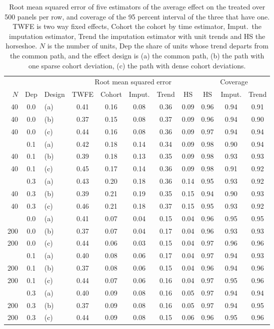 \begin{table}[ht]
\centering
\caption{Root mean squared error of five estimators of the average effect on the treated over 500 panels per row, and coverage of the 95 percent interval of the three that have one. TWFE is two way fixed effects, Cohort the cohort by time estimator, Imput.\ the imputation estimator, Trend the imputation estimator with unit trends and HS the horseshoe. $N$ is the number of units, Dep the share of units whose trend departs from the common path, and the effect design is (a) the common path, (b) the path with one sparse cohort deviation, (c) the path with dense cohort deviations.}
\label{tab:didsimgrid}
\footnotesize
\setlength{\tabcolsep}{4pt}
\begin{tabular}{@{}rclcccccccc@{}}
\toprule
& & & \multicolumn{5}{c}{Root mean squared error} & \multicolumn{3}{c}{Coverage} \\
\cmidrule(lr){4-8}\cmidrule(lr){9-11}
$N$ & Dep & Design & TWFE & Cohort & Imput. & Trend & HS & HS & Imput. & Trend \\
\midrule
40 & 0.0 & (a) & 0.41 & 0.16 & 0.08 & 0.36 & 0.09 & 0.96 & 0.94 & 0.91 \\
40 & 0.0 & (b) & 0.37 & 0.15 & 0.08 & 0.37 & 0.09 & 0.96 & 0.94 & 0.90 \\
40 & 0.0 & (c) & 0.44 & 0.16 & 0.08 & 0.36 & 0.09 & 0.97 & 0.94 & 0.94 \\
\addlinespace
40 & 0.1 & (a) & 0.42 & 0.18 & 0.14 & 0.34 & 0.09 & 0.98 & 0.90 & 0.94 \\
40 & 0.1 & (b) & 0.39 & 0.18 & 0.13 & 0.35 & 0.09 & 0.98 & 0.93 & 0.93 \\
40 & 0.1 & (c) & 0.45 & 0.17 & 0.14 & 0.36 & 0.09 & 0.98 & 0.91 & 0.92 \\
\addlinespace
40 & 0.3 & (a) & 0.43 & 0.20 & 0.18 & 0.36 & 0.14 & 0.95 & 0.93 & 0.92 \\
40 & 0.3 & (b) & 0.39 & 0.21 & 0.19 & 0.35 & 0.15 & 0.94 & 0.90 & 0.93 \\
40 & 0.3 & (c) & 0.46 & 0.21 & 0.18 & 0.37 & 0.15 & 0.95 & 0.93 & 0.92 \\
\addlinespace
200 & 0.0 & (a) & 0.41 & 0.07 & 0.04 & 0.15 & 0.04 & 0.96 & 0.95 & 0.95 \\
200 & 0.0 & (b) & 0.37 & 0.07 & 0.04 & 0.17 & 0.04 & 0.96 & 0.93 & 0.93 \\
200 & 0.0 & (c) & 0.44 & 0.06 & 0.03 & 0.15 & 0.04 & 0.97 & 0.96 & 0.96 \\
\addlinespace
200 & 0.1 & (a) & 0.40 & 0.08 & 0.06 & 0.17 & 0.04 & 0.97 & 0.94 & 0.93 \\
200 & 0.1 & (b) & 0.37 & 0.08 & 0.06 & 0.15 & 0.04 & 0.96 & 0.94 & 0.96 \\
200 & 0.1 & (c) & 0.44 & 0.07 & 0.06 & 0.16 & 0.04 & 0.97 & 0.95 & 0.96 \\
\addlinespace
200 & 0.3 & (a) & 0.40 & 0.09 & 0.08 & 0.16 & 0.05 & 0.97 & 0.94 & 0.94 \\
200 & 0.3 & (b) & 0.37 & 0.09 & 0.08 & 0.16 & 0.05 & 0.97 & 0.94 & 0.95 \\
200 & 0.3 & (c) & 0.44 & 0.09 & 0.08 & 0.15 & 0.06 & 0.96 & 0.95 & 0.96 \\
\bottomrule
\end{tabular}
\end{table}
